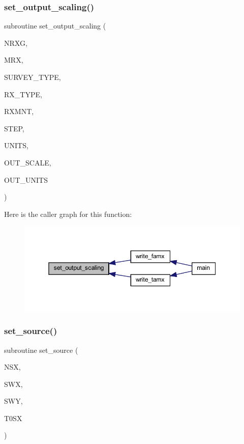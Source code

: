 \subsubsection{\texorpdfstring{set\+\_\+output\+\_\+scaling()}{set\_output\_scaling()}}
{\footnotesize\ttfamily subroutine set\+\_\+output\+\_\+scaling (\begin{DoxyParamCaption}\item[{integer, intent(in)}]{N\+R\+XG,  }\item[{integer, intent(in)}]{M\+RX,  }\item[{integer, intent(in)}]{S\+U\+R\+V\+E\+Y\+\_\+\+T\+Y\+PE,  }\item[{integer, dimension(nrxg), intent(in)}]{R\+X\+\_\+\+T\+Y\+PE,  }\item[{real, dimension(mrx, nrxg), intent(in)}]{R\+X\+M\+NT,  }\item[{integer, intent(in)}]{S\+T\+EP,  }\item[{integer, dimension(nrxg), intent(in)}]{U\+N\+I\+TS,  }\item[{real, dimension(mrx, nrxg), intent(out)}]{O\+U\+T\+\_\+\+S\+C\+A\+LE,  }\item[{character (len = 04), dimension(nrxg), intent(out)}]{O\+U\+T\+\_\+\+U\+N\+I\+TS }\end{DoxyParamCaption})}

Here is the caller graph for this function\+:
\nopagebreak
\begin{figure}[H]
\begin{center}
\leavevmode
\includegraphics[width=350pt]{Marco_8f90_aa3ebed79e45d9533c2e2d7c6e1cdc01a_icgraph}
\end{center}
\end{figure}
\mbox{\label{Marco_8f90_a64c5bf1e6006ac36e86c8ff7014ecab7}} 
\subsubsection{\texorpdfstring{set\+\_\+source()}{set\_source()}}
{\footnotesize\ttfamily subroutine set\+\_\+source (\begin{DoxyParamCaption}\item[{integer, intent(in)}]{N\+SX,  }\item[{real, dimension(nsx), intent(in)}]{S\+WX,  }\item[{real, dimension(nsx,3), intent(inout)}]{S\+WY,  }\item[{real}]{T0\+SX }\end{DoxyParamCaption})}

